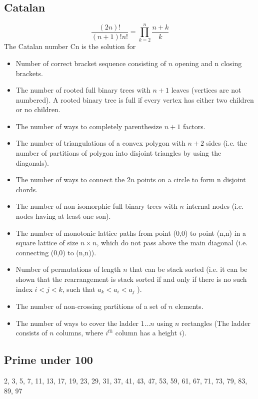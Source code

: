 \documentclass[A4 paper, 12pt, oneside, landscape]{article}
\begin{document}
\begin{multicols}{2}
	\subsection{Catalan}
	\[\frac{(2n)!}{(n + 1)!n!} = \prod_{k = 2}^n \frac{n + k}{k} \]
	The Catalan number Cn is the solution for
	\begin{itemize}
	    \item Number of correct bracket sequence consisting of $n$ opening and n closing brackets.
	    \item The number of rooted full binary trees with $n+1$ leaves (vertices are not numbered). A rooted binary tree is full if every vertex has either two children or no children.
	    \item The number of ways to completely parenthesize $n+1$ factors.
	    \item The number of triangulations of a convex polygon with $n+2$ sides (i.e. the number of partitions of polygon into disjoint triangles by using the diagonals).
	    \item The number of ways to connect the $2n$ points on a circle to form n disjoint chords.
	    \item The number of non-isomorphic full binary trees with $n$ internal nodes (i.e. nodes having at least one son).
	    \item The number of monotonic lattice paths from point (0,0) to point (n,n) in a square lattice of size $n \times n$, which do not pass above the main diagonal (i.e. connecting (0,0) to (n,n)).
	    \item Number of permutations of length $n$ that can be stack sorted (i.e. it can be shown that the rearrangement is stack sorted if and only if there is no such index $i<j<k$, such that $a_k<a_i<a_j$ ).
	    \item The number of non-crossing partitions of a set of $n$ elements.
        \item The number of ways to cover the ladder $1...n$ using $n$ rectangles (The ladder consists of $n$ columns, where $i^{th}$ column has a height $i$).
	\end{itemize}

	\subsection{Prime under 100}
	2, 3, 5, 7, 11, 13, 17, 19, 23, 29, 31, 37, 41, 43, 47, 53, 59, 61, 67, 71, 73, 79, 83, 89, 97 
	

\end{multicols}
\end{document}
